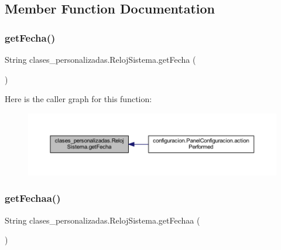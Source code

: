\subsection{Member Function Documentation}
\mbox{\label{classclases__personalizadas_1_1_reloj_sistema_a24cad8ca53e9214a81dfb413f632ff57}} 
\subsubsection{\texorpdfstring{get\+Fecha()}{getFecha()}}
{\footnotesize\ttfamily String clases\+\_\+personalizadas.\+Reloj\+Sistema.\+get\+Fecha (\begin{DoxyParamCaption}{ }\end{DoxyParamCaption})}

Here is the caller graph for this function\+:
\nopagebreak
\begin{figure}[H]
\begin{center}
\leavevmode
\includegraphics[width=350pt]{classclases__personalizadas_1_1_reloj_sistema_a24cad8ca53e9214a81dfb413f632ff57_icgraph}
\end{center}
\end{figure}
\mbox{\label{classclases__personalizadas_1_1_reloj_sistema_a68dfd11750ec0a30be4646221c75e683}} 
\subsubsection{\texorpdfstring{get\+Fechaa()}{getFechaa()}}
{\footnotesize\ttfamily String clases\+\_\+personalizadas.\+Reloj\+Sistema.\+get\+Fechaa (\begin{DoxyParamCaption}{ }\end{DoxyParamCaption})}


